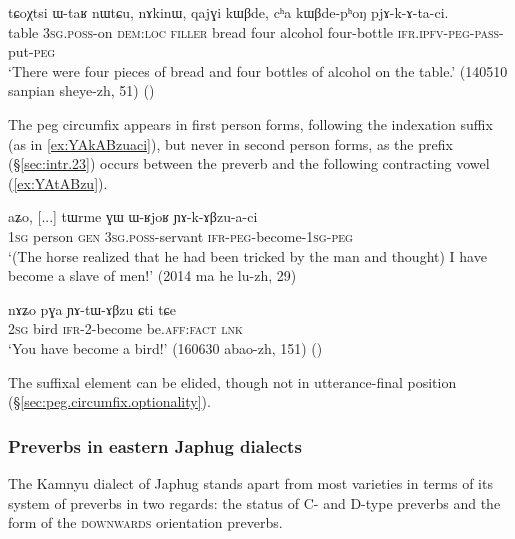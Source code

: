 \begin{exe}
\ex \label{ex:pjAkAtaci.passive}
 \gll   tɕoχtsi ɯ-taʁ nɯtɕu, nɤkinɯ, qajɣi kɯβde, cʰa kɯβde-pʰoŋ pjɤ-k-ɤ-ta-ci. \\
table \textsc{3sg}.\textsc{poss}-on \textsc{dem}:\textsc{loc} \textsc{filler} bread four alcohol four-bottle \textsc{ifr}.\textsc{ipfv}-\textsc{peg}-\textsc{pass}-put-\textsc{peg} \\
\glt `There were four pieces of bread and four bottles of alcohol on the table.' (140510 sanpian sheye-zh, 51)
()
\end{exe}

The peg circumfix appears in first person forms, following the indexation suffix (as in \ref{ex:YAkABzuaci}), but never in second person forms, as the  prefix (§\ref{sec:intr.23}) occurs between the preverb and the following contracting vowel (\ref{ex:YAtABzu}).

\begin{exe}
\ex \label{ex:YAkABzuaci}
 \gll aʑo, [...] tɯrme ɣɯ ɯ-ʁjoʁ ɲɤ-k-ɤβzu-a-ci \\
 \textsc{1sg} { } person \textsc{gen} \textsc{3sg}.\textsc{poss}-servant \textsc{ifr}-\textsc{peg}-become-\textsc{1sg}-\textsc{peg} \\
 \glt `(The horse realized that he had been tricked by the man and thought) I have become a slave of men!' (2014 ma he lu-zh, 29)
\end{exe}

\begin{exe}
\ex \label{ex:YAtABzu}
 \gll nɤʑo pɣa ɲɤ-tɯ-ɤβzu ɕti tɕe \\
 \textsc{2sg} bird \textsc{ifr}-2-become be.\textsc{aff}:\textsc{fact} \textsc{lnk} \\
 \glt `You have become a bird!' (160630 abao-zh, 151)
()
 \end{exe}
 
 
The  suffixal element can be elided, though not in utterance-final position (§\ref{sec:peg.circumfix.optionality}).

 
\subsubsection{Preverbs in eastern Japhug dialects} \label{sec:xtokavian.preverbs}
The Kamnyu dialect of Japhug stands apart from most varieties in terms of its system of preverbs in two regards: the status of C- and D-type preverbs and the form of the \textsc{downwards} orientation preverbs.

